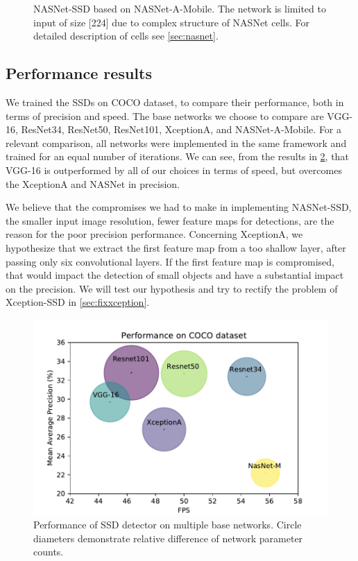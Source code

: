 \begin{figure}
    \centering
    \nasnetSSD
    \caption[NASNet-SSD]%
    {NASNet-SSD based on NASNet-A-Mobile. The network is limited to input of size [224] due to complex structure of NASNet cells. For detailed description of cells see \cref{sec:nasnet}.}
    \label{fig:nasnetSSD}
\end{figure}

\subsection{Performance results}
We trained the SSDs on COCO dataset, to compare their performance, both in terms of precision and speed. The base networks we choose to compare are VGG-16, ResNet34, ResNet50, ResNet101, XceptionA, and NASNet-A-Mobile. For a relevant comparison, all networks were implemented in the same framework and trained for an equal number of iterations. We can see, from the results in \cref{fig:cocoperf}, that VGG-16 is outperformed by all of our choices in terms of speed, but overcomes the XceptionA and NASNet in precision. 

We believe that the compromises we had to make in implementing NASNet-SSD, the smaller input image resolution, fewer feature maps for detections, are the reason for the poor precision performance. Concerning XceptionA, we hypothesize that we extract the first feature map from a too shallow layer, after passing only six convolutional layers. If the first feature map is compromised, that would impact the detection of small objects and have a substantial impact on the precision. We will test our hypothesis and try to rectify the problem of Xception-SSD in \cref{sec:fixxception}.

\begin{figure}
    \centering
    \includegraphics[width=\textwidth]{img/fps_map_c}
    \caption[Performance of SSD with multiple base networks on COCO dataset]{Performance of SSD detector on multiple base networks. Circle diameters demonstrate relative difference of network parameter counts.}
    \label{fig:cocoperf}
\end{figure}

